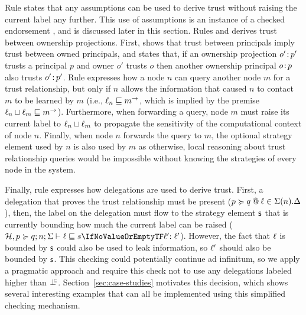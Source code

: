 Rule  states that any assumptions can be used to derive trust without raising the current label any further. This use of assumptions is an instance of a checked endorsement \cite{Chong:2007:SWA:1294261.1294265, DBLP:journals/corr/abs-1107-5594}, and is discussed later in this section.
Rules  and  derives trust between ownership projections. First,  shows that trust between principals imply trust between owned principals, and  states that, if an ownership projection $o' \colon \!p'$ trusts a principal $p$ and owner $o'$ trusts $o$ then another ownership principal $o \colon \!p$ also trusts $o' \colon \!p'$.
Rule  expresses how a node $n$ can query another node $m$ for a trust relationship, but only if $n$ allows the information that caused $n$ to contact $m$ to be learned by $m$ (i.e., $\ell_n \sqsubseteq m^{\rightarrow}$, which is implied by the premise $\ell_n \sqcup \ell_m \sqsubseteq m^{\rightarrow}$). Furthermore, when forwarding a query, node $m$ must raise its current label to $\ell_n \sqcup \ell_m$ to propagate the sensitivity of the computational context of node $n$. Finally, when node $n$ forwards the query to $m$, the optional strategy element used by $n$ is also used by $m$ as otherwise, local reasoning about trust relationship queries would be impossible without knowing the strategies of every node in the system.

Finally, rule  expresses how delegations are used to derive trust. First, a delegation that proves the trust relationship must be present ($p \succcurlyeq q \mathbin{@} \ell \in \Sigma(n).\Delta$), then, the label on the delegation must flow to the strategy element $\stratelem$ that is currently bounding how much the current label can be raised ($\flowstoquery{\Assumps, p \actsfor q; n; \env}{\level}{s}{\level'}$). However, the fact that $\ell$ is bounded by $\stratelem$ could also be used to leak information, so $\ell'$ should also be bounded by $\stratelem$. This checking could potentially continue ad infinitum, so we apply a pragmatic approach and require this check not to use any delegations labeled higher than $\botinfoflow$. Section~\ref{sec:case-studies} motivates this decision, which shows several interesting examples that can all be implemented using this simplified checking mechanism.

